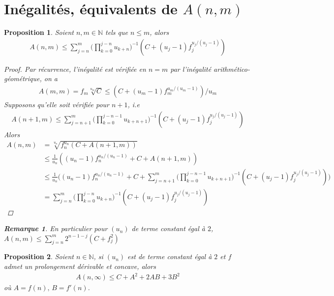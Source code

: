 \documentclass{article}
\newtheorem{prop}{Proposition}
\newtheorem*{remark}{Remarque}
\begin{document}
\section{Inégalités, équivalents de $A(n,m)$}
\begin{prop}
Soient $n,m\in\mathbb{N}$ tels que $n\leq m$, alors
\begin{align*}
A(n,m)\leq \sum_{j=n}^{m}\bigg(\prod_{k=0}^{j-n}{u_{k+n}}\bigg)^{-1}(C+(u_j-1)f_{j}^{u_{j}/(u_j-1)})
\end{align*}
\begin{proof}
Par récurrence, l'inégalité est vérifiée en $n=m$ par l'inégalité arithmético-géométrique, on a 
\begin{align*}
A(m,m)=f_m\sqrt[u_m]{C}\leq (C+(u_m-1)f^{u_m/(u_m-1)}_m)/u_m
\end{align*}
Supposons qu'elle soit vérifiée pour $n+1$, i.e
\begin{align*}
A(n+1,m)\leq \sum_{j=n+1}^{m}\bigg(\prod_{k=0}^{j-n-1}u_{k+n+1}\bigg)^{-1}(C+(u_j-1)f_{j}^{u_{j}/(u_j-1)})
\end{align*}
Alors
\begin{align*}
A(n,m) & = \sqrt[u_n]{f_{n}^{u_n}(C+A(n+1,m))}\\
& \leq \frac{1}{u_n}((u_n-1)f_{n}^{u_n/(u_n-1)}+C+A(n+1,m))\\
& \leq \frac{1}{u_n}\bigg((u_n-1)f_{n}^{u_n/(u_n-1)}+C+\sum_{j=n+1}^{m}\bigg(\prod_{k=0}^{j-n-1}u_{k+n+1}\bigg)^{-1}(C+(u_j-1)f_{j}^{u_{j}/(u_j-1)})\bigg)\\
& =  \sum_{j=n}^{m}\bigg(\prod_{k=0}^{j-n}{u_{k+n}}\bigg)^{-1}(C+(u_j-1)f_{j}^{u_{j}/(u_j-1)})
\end{align*}
\end{proof}
\begin{remark}
En particulier pour $(u_n)$ de terme constant égal à $2$,
$A(n,m)\leq \sum_{j=n}^{m}{2^{n-1-j}(C+f^2_j)}$
\end{remark}
\end{prop}
\begin{prop}
Soient $n\in\mathbb{N}$, si $(u_n)$ est de terme constant égal à $2$ et $f$ admet un prolongement dérivable et concave, alors
\begin{align*}
A(n,\infty)\leq C+A^2+2AB+3B^2
\end{align*}
où $A = f(n), \,B = f'(n)$.
\end{prop}
\end{document}
